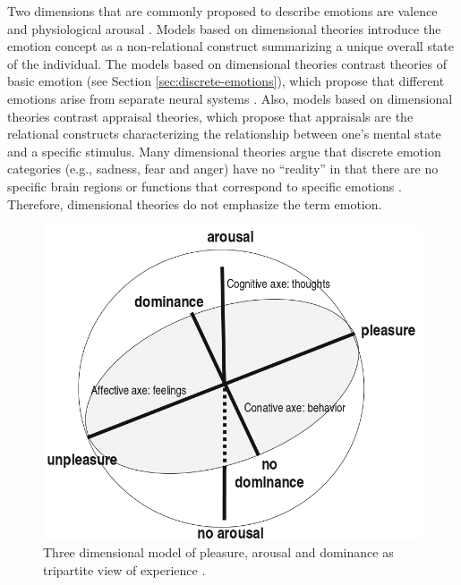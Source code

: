 \documentclass[12pt]{report}
\begin{document}
Two dimensions that are commonly proposed to describe emotions are valence and
physiological arousal \cite{arnold:emotion-personality}
\cite{lazarus:cognitive-theory-emotion} \cite{russell:circumplex-affect}. Models
based on dimensional theories introduce the emotion concept as a non-relational
construct summarizing a unique overall state of the individual. The models based
on dimensional theories contrast theories of basic emotion (see Section
\ref{sec:discrete-emotions}), which propose that different emotions arise from
separate neural systems \cite{posner:circumplex-affect}. Also, models based on
dimensional theories contrast appraisal theories, which propose that appraisals
are the relational constructs characterizing the relationship between one's
mental state and a specific stimulus. Many dimensional theories argue that
discrete emotion categories (e.g., sadness, fear and anger) have no ``reality''
in that there are no specific brain regions or functions that correspond to
specific emotions \cite{barrett:emotions-natural}. Therefore, dimensional
theories do not emphasize the term emotion.

\begin{figure}[tbh]
  \center
  \includegraphics[width=.6\textwidth]{figure/dimensional2.png}
  \caption{Three dimensional model of pleasure, arousal and dominance as
  tripartite view of experience \cite{mehrabian:pad}.}
  \label{fig:pad}
\end{figure}
\end{document}
